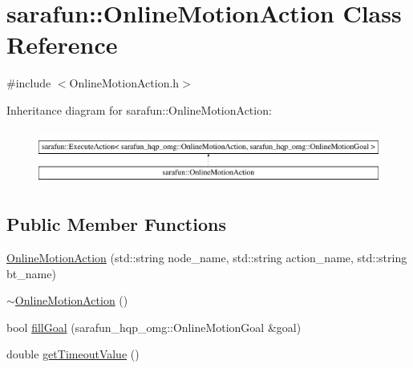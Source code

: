 \hypertarget{classsarafun_1_1OnlineMotionAction}{\section{sarafun\-:\-:Online\-Motion\-Action Class Reference}
\label{classsarafun_1_1OnlineMotionAction}
}


{\ttfamily \#include $<$Online\-Motion\-Action.\-h$>$}

Inheritance diagram for sarafun\-:\-:Online\-Motion\-Action\-:\begin{figure}[H]
\begin{center}
\leavevmode
\includegraphics[height=1.845140cm]{classsarafun_1_1OnlineMotionAction}
\end{center}
\end{figure}
\subsection*{Public Member Functions}
\begin{DoxyCompactItemize}
\item 
\hyperlink{classsarafun_1_1OnlineMotionAction_ab66225e6e9383411dc925e88fb1cf4f9}{Online\-Motion\-Action} (std\-::string node\-\_\-name, std\-::string action\-\_\-name, std\-::string bt\-\_\-name)
\item 
\hyperlink{classsarafun_1_1OnlineMotionAction_a63134a65e9ead7a8250abe2afee5b388}{$\sim$\-Online\-Motion\-Action} ()
\item 
bool \hyperlink{classsarafun_1_1OnlineMotionAction_aacaa264dad7ba07b5c9a985d66ea48f7}{fill\-Goal} (sarafun\-\_\-hqp\-\_\-omg\-::\-Online\-Motion\-Goal \&goal)
\item 
double \hyperlink{classsarafun_1_1OnlineMotionAction_a453e7dca41a0d73b5297ce191e760b31}{get\-Timeout\-Value} ()
\end{DoxyCompactItemize}


